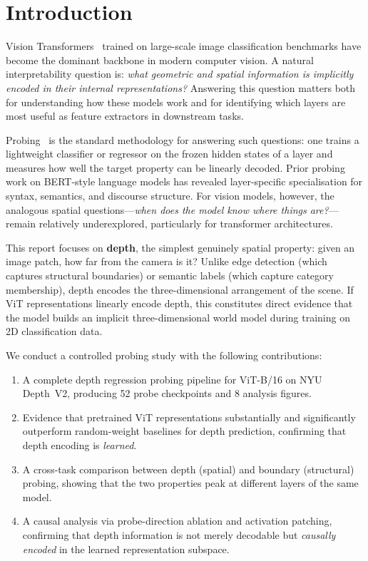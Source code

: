 \documentclass[11pt,a4paper]{article}
\begin{document}
\section{Introduction}

Vision Transformers~\cite{dosovitskiy2021vit} trained on large-scale image
classification benchmarks have become the dominant backbone in modern computer
vision.  A natural interpretability question is: \emph{what geometric and
spatial information is implicitly encoded in their internal representations?}
Answering this question matters both for understanding how these models work and
for identifying which layers are most useful as feature extractors in downstream
tasks.

Probing~\cite{alain2017understanding} is the standard methodology for
answering such questions: one trains a lightweight classifier or regressor
on the frozen hidden states of a layer and measures how well the target
property can be linearly decoded.  Prior probing work on BERT-style language
models has revealed layer-specific specialisation for syntax, semantics, and
discourse structure.  For vision models, however, the analogous spatial
questions---\emph{when does the model know where things are?}---remain
relatively underexplored, particularly for transformer architectures.

This report focuses on \textbf{depth}, the simplest genuinely spatial
property: given an image patch, how far from the camera is it?  Unlike edge
detection (which captures structural boundaries) or semantic labels (which
capture category membership), depth encodes the three-dimensional arrangement
of the scene.  If ViT representations linearly encode depth, this constitutes
direct evidence that the model builds an implicit three-dimensional world
model during training on 2D classification data.

We conduct a controlled probing study with the following contributions:
\begin{enumerate}[noitemsep]
    \item A complete depth regression probing pipeline for ViT-B/16 on NYU
          Depth~V2, producing 52 probe checkpoints and 8 analysis figures.
    \item Evidence that pretrained ViT representations substantially and
          significantly outperform random-weight baselines for depth prediction,
          confirming that depth encoding is \emph{learned}.
    \item A cross-task comparison between depth (spatial) and boundary
          (structural) probing, showing that the two properties peak at
          different layers of the same model.
    \item A causal analysis via probe-direction ablation and activation
          patching, confirming that depth information is not merely
          decodable but \emph{causally encoded} in the learned
          representation subspace.
\end{enumerate}
\end{document}
